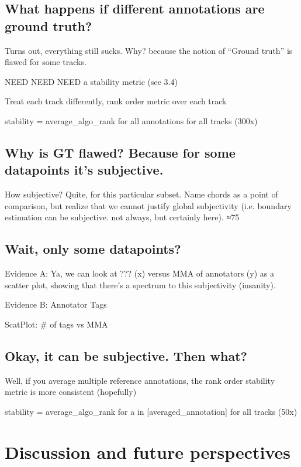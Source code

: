 \documentclass{article}
\begin{document}

\subsection{What happens if different annotations are ground truth?}

Turns out, everything still sucks. Why? because the notion of “Ground truth” is flawed for some tracks.

NEED NEED NEED a stability metric (see 3.4)

Treat each track differently, rank order metric over each track

stability = average\_algo\_rank for all annotations for all tracks (300x)

\subsection{Why is GT flawed? Because for some datapoints it’s subjective.}

How subjective? Quite, for this particular subset. Name chords as a point of comparison, but realize that we cannot justify global subjectivity (i.e. boundary estimation can be subjective. not always, but certainly here). ≈75%

\subsection{Wait, only some datapoints?}

Evidence A: Ya, we can look at ??? (x) versus MMA of annotators (y) as a scatter plot, showing that there’s a spectrum to this subjectivity (insanity).

Evidence B: Annotator Tags

ScatPlot: \# of tags vs MMA

\subsection{Okay, it can be subjective. Then what?}

Well, if you average multiple reference annotations, the rank order stability metric is more consistent (hopefully)

stability = average\_algo\_rank for a in [averaged\_annotation] for all tracks (50x)	

\section{Discussion and future perspectives}
\end{document}

